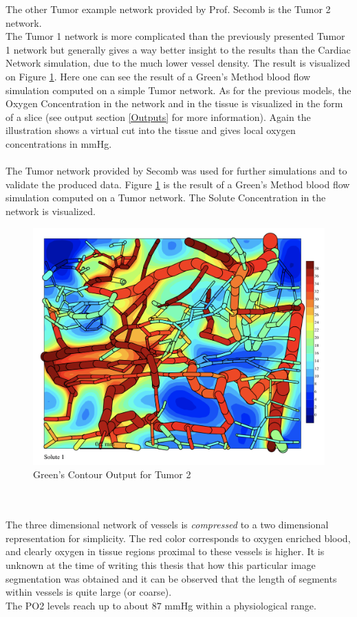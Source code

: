 The other Tumor example network provided by Prof. Secomb is the Tumor 2 network.
\\The Tumor 1 network is more complicated than the previously presented Tumor 1 network but generally gives a way better insight to the results than the Cardiac Network simulation, due to the much lower vessel density. The result is visualized on Figure \ref{fig:Contour_TumorDuke}. Here one can see the result of a Green's Method blood flow simulation computed on a simple Tumor network. As for the previous models, the Oxygen Concentration in the network and in the tissue is visualized in the form of a slice (see output section \ref{Outputs} for more information). Again the illustration shows a virtual cut into the tissue and gives local oxygen concentrations in mmHg.\\\\
The Tumor network provided by Secomb was used for further simulations and to validate the produced data.
Figure \ref{fig:Contour_TumorDuke}  is the result of a Green's Method blood flow simulation computed on a Tumor network. The Solute Concentration in the network is visualized.\\
\begin{figure}[h]
\centering
\includegraphics[width=120mm]{Contour_TumorDuke}
\caption{\footnotesize Green's Contour Output for Tumor 2}
\label{fig:Contour_TumorDuke}
\end{figure}\\
\\The three dimensional network of vessels is \emph{compressed} to a two
dimensional representation for simplicity.  The red color corresponds to oxygen enriched blood, and clearly oxygen in tissue regions proximal to these vessels is higher. It is unknown at the time of writing this thesis that how this particular image segmentation was obtained and it can be observed that the length of segments within vessels is quite large (or coarse).
\\The PO2 levels reach up to about $87$ mmHg within a physiological range. 

